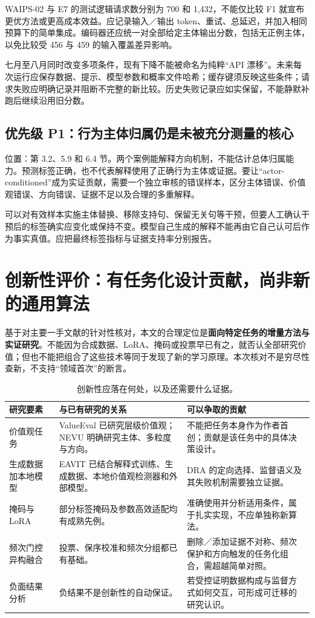 \documentclass[12pt,a4paper]{article}
\begin{document}
WAIPS-02 与 E7 的测试逻辑请求数分别为 700 和 1,432，不能仅比较 F1 就宣布更优方法或更高成本效益。应记录输入／输出 token、重试、总延迟，并加入相同预算下的简单集成。编码器还应统一对全部给定主体输出分数，包括无正例主体，以免比较受 456 与 459 的输入覆盖差异影响。

七月至八月同时改变多项条件，现有下降不能被命名为纯粹“API 漂移”。未来每次运行应保存数据、提示、模型参数和概率文件哈希；缓存键须反映这些条件；请求失败应明确记录并阻断不完整的新比较。历史失败记录应如实保留，不能静默补跑后继续沿用旧分数。

\subsection{优先级 P1：行为主体归属仍是未被充分测量的核心}
位置：第 3.2、5.9 和 6.4 节。两个案例能解释方向机制，不能估计总体归属能力。预测标签正确，也不代表解释使用了正确行为主体或证据。要让“actor-conditioned”成为实证贡献，需要一个独立审核的错误样本，区分主体错误、价值观错误、方向错误、证据不足以及合理的多重解释。

可以对有效样本实施主体替换、移除支持句、保留无关句等干预，但要人工确认干预后的标签确实应变化或保持不变。模型自己生成的解释不能再由它自己认可后作为事实真值。应把最终标签指标与证据支持率分别报告。

\section{创新性评价：有任务化设计贡献，尚非新的通用算法}
基于对主要一手文献的针对性核对，本文的合理定位是\textbf{面向特定任务的增量方法与实证研究}。不能因为合成数据、LoRA、掩码或投票早已有之，就否认全部研究价值；但也不能把组合了这些技术等同于发现了新的学习原理。本次核对不是穷尽性查新，不支持“领域首次”的断言。

\begin{table}[htbp]
\centering\small
\caption{创新性应落在何处，以及还需要什么证据。}
\begin{tabularx}{\textwidth}{@{}P{2.5cm}YY@{}}
\toprule
研究要素 & 与已有研究的关系 & 可以争取的贡献 \\
\midrule
价值观任务 & ValueEval 已研究层级价值观；NEVU 明确研究主体、多粒度与方向。 & 不能把任务本身作为作者首创；贡献是该任务中的具体决策设计。 \\
生成数据加本地模型 & EAVIT 已结合解释式训练、生成数据、本地价值观检测器和外部模型。 & DRA 的定向选择、监督语义及其失败机制需要独立证据。 \\
掩码与 LoRA & 部分标签掩码及参数高效适配均有成熟先例。 & 准确使用并分析适用条件，属于扎实实现，不应单独称新算法。 \\
频次门控异构融合 & 投票、保序校准和频次分组都已有基础。 & 删除／添加证据不对称、频次保护和方向触发的任务化组合，需超越简单对照。 \\
负面结果分析 & 负结果不是创新性的自动保证。 & 若受控证明数据构成与监督方式如何交互，可形成可迁移的研究认识。 \\
\bottomrule
\end{tabularx}
\end{table}
\end{document}
